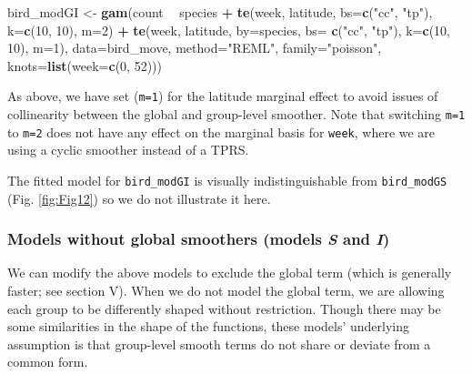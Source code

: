 \documentclass[12pt]{article}
\newenvironment{Shaded}{\begin{snugshade}}{\end{snugshade}}
\newcommand{\KeywordTok}[1]{\textcolor[rgb]{0.13,0.29,0.53}{\textbf{#1}}}
\newcommand{\DataTypeTok}[1]{\textcolor[rgb]{0.13,0.29,0.53}{#1}}
\newcommand{\DecValTok}[1]{\textcolor[rgb]{0.00,0.00,0.81}{#1}}
\newcommand{\StringTok}[1]{\textcolor[rgb]{0.31,0.60,0.02}{#1}}
\newcommand{\OperatorTok}[1]{\textcolor[rgb]{0.81,0.36,0.00}{\textbf{#1}}}
\newcommand{\NormalTok}[1]{#1}
\begin{document}
\begin{Shaded}
\begin{Highlighting}[]
\NormalTok{bird_modGI <-}\StringTok{ }\KeywordTok{gam}\NormalTok{(count }\OperatorTok{~}\StringTok{ }\NormalTok{species }\OperatorTok{+}
\StringTok{                    }\KeywordTok{te}\NormalTok{(week, latitude, }\DataTypeTok{bs=}\KeywordTok{c}\NormalTok{(}\StringTok{"cc"}\NormalTok{, }\StringTok{"tp"}\NormalTok{), }\DataTypeTok{k=}\KeywordTok{c}\NormalTok{(}\DecValTok{10}\NormalTok{, }\DecValTok{10}\NormalTok{), }\DataTypeTok{m=}\DecValTok{2}\NormalTok{) }\OperatorTok{+}
\StringTok{                    }\KeywordTok{te}\NormalTok{(week, latitude, }\DataTypeTok{by=}\NormalTok{species, }\DataTypeTok{bs=} \KeywordTok{c}\NormalTok{(}\StringTok{"cc"}\NormalTok{, }\StringTok{"tp"}\NormalTok{),}
                       \DataTypeTok{k=}\KeywordTok{c}\NormalTok{(}\DecValTok{10}\NormalTok{, }\DecValTok{10}\NormalTok{), }\DataTypeTok{m=}\DecValTok{1}\NormalTok{),}
                 \DataTypeTok{data=}\NormalTok{bird_move, }\DataTypeTok{method=}\StringTok{"REML"}\NormalTok{, }\DataTypeTok{family=}\StringTok{"poisson"}\NormalTok{,}
                 \DataTypeTok{knots=}\KeywordTok{list}\NormalTok{(}\DataTypeTok{week=}\KeywordTok{c}\NormalTok{(}\DecValTok{0}\NormalTok{, }\DecValTok{52}\NormalTok{)))}
\end{Highlighting}
\end{Shaded}

As above, we have set (\texttt{m=1}) for the latitude marginal effect to
avoid issues of collinearity between the global and group-level
smoother. Note that switching \texttt{m=1} to \texttt{m=2} does not have
any effect on the marginal basis for \texttt{week}, where we are using a
cyclic smoother instead of a TPRS.

The fitted model for \texttt{bird\_modGI} is visually indistinguishable
from \texttt{bird\_modGS} (Fig. \ref{fig:Fig12}) so we do not illustrate
it here.

\subsubsection{\texorpdfstring{Models without global smoothers (models
\emph{S} and
\emph{I})}{Models without global smoothers (models S and I)}}\label{models-without-global-smoothers-models-s-and-i}

We can modify the above models to exclude the global term (which is
generally faster; see section V). When we do not model the global term,
we are allowing each group to be differently shaped without restriction.
Though there may be some similarities in the shape of the functions,
these models' underlying assumption is that group-level smooth terms do
not share or deviate from a common form.
\end{document}
